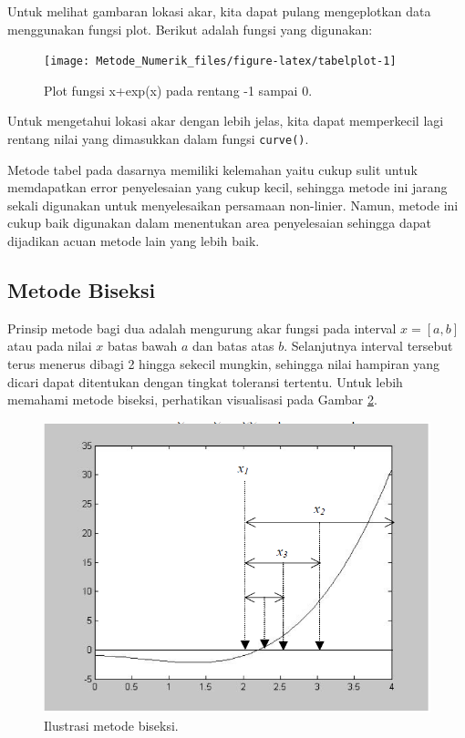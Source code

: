 \documentclass[]{book}
\theoremstyle{definition}
\theoremstyle{definition}
\theoremstyle{definition}
\theoremstyle{remark}
\begin{document}
Untuk melihat gambaran lokasi akar, kita dapat pulang mengeplotkan data menggunakan fungsi plot. Berikut adalah fungsi yang digunakan:

\begin{figure}

{\centering \texttt{[image: Metode\_Numerik\_files/figure-latex/tabelplot-1]} 

}

\caption{Plot fungsi x+exp(x) pada rentang -1 sampai 0.}\label{fig:tabelplot}
\end{figure}

Untuk mengetahui lokasi akar dengan lebih jelas, kita dapat memperkecil lagi rentang nilai yang dimasukkan dalam fungsi \texttt{curve()}.

Metode tabel pada dasarnya memiliki kelemahan yaitu cukup sulit untuk memdapatkan error penyelesaian yang cukup kecil, sehingga metode ini jarang sekali digunakan untuk menyelesaikan persamaan non-linier. Namun, metode ini cukup baik digunakan dalam menentukan area penyelesaian sehingga dapat dijadikan acuan metode lain yang lebih baik.

\hypertarget{bisection}{%
\subsection{Metode Biseksi}\label{bisection}}

Prinsip metode bagi dua adalah mengurung akar fungsi pada interval \(x=\left[a,b \right]\) atau pada nilai \(x\) batas bawah \(a\) dan batas atas \(b\). Selanjutnya interval tersebut terus menerus dibagi 2 hingga sekecil mungkin, sehingga nilai hampiran yang dicari dapat ditentukan dengan tingkat toleransi tertentu. Untuk lebih memahami metode biseksi, perhatikan visualisasi pada Gambar \ref{fig:biseksi}.

\begin{figure}

{\centering \includegraphics[width=0.8\linewidth]{./images/biseksi} 

}

\caption{Ilustrasi metode biseksi.}\label{fig:biseksi}
\end{figure}
\end{document}
